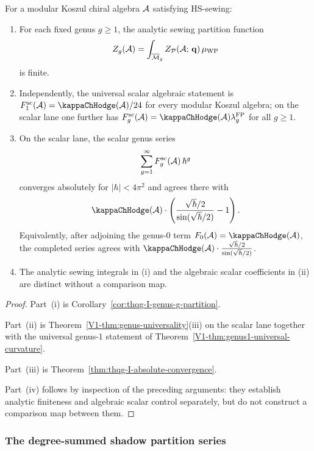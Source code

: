 \begin{proposition}
For a modular Koszul chiral algebra $\mathcal{A}$ satisfying HS-sewing:
\begin{enumerate}[label=\textup{(\roman*)}]
\item For each fixed genus $g \geq 1$, the analytic sewing partition
function
\[
Z_g(\mathcal{A}) = \int_{\overline{\mathcal{M}}_g}
Z_{\mathcal{P}}(\mathcal{A};\,\mathbf{q})\,\mu_{\mathrm{WP}}
\]
is finite.
\item Independently, the universal scalar algebraic statement is
$F_1^{\mathrm{sc}}(\cA)=\kappaChHodge(\cA)/24$ for every modular Koszul algebra; on the
scalar lane one further has
$F_g^{\mathrm{sc}}(\cA)=\kappaChHodge(\cA)\lambda_g^{\mathrm{FP}}$ for all $g \geq 1$.
\item On the scalar lane, the scalar genus series
\[
\sum_{g=1}^{\infty} F_g^{\mathrm{sc}}(\mathcal{A})\,\hbar^g
\]
converges absolutely for $|\hbar| < 4\pi^2$ and agrees there with
\[
\kappaChHodge(\cA)\cdot\left(\frac{\sqrt{\hbar}/2}{\sin(\sqrt{\hbar}/2)} - 1\right).
\]
Equivalently, after adjoining the genus-$0$ term
$F_0(\cA)=\kappaChHodge(\cA)$, the completed series agrees with
$\kappaChHodge(\cA)\cdot\frac{\sqrt{\hbar}/2}{\sin(\sqrt{\hbar}/2)}$.
\item The analytic sewing integrals in \textup{(i)} and the algebraic
scalar coefficients in \textup{(ii)} are distinct without a comparison
map.
\end{enumerate}
\end{proposition}

\begin{proof}
Part~(i) is Corollary~\ref{cor:thqg-I-genus-g-partition}.

Part~(ii) is Theorem~\ref{V1-thm:genus-universality}\textup{(iii)} on the
scalar lane together with the universal genus-$1$
statement of Theorem~\ref{V1-thm:genus1-universal-curvature}.

Part~(iii) is Theorem~\ref{thm:thqg-I-absolute-convergence}.

Part~(iv) follows by inspection of the preceding arguments: they
establish analytic finiteness and algebraic scalar control separately,
but do not construct a comparison map between them.
\end{proof}

\subsubsection{The degree-summed shadow partition series}

